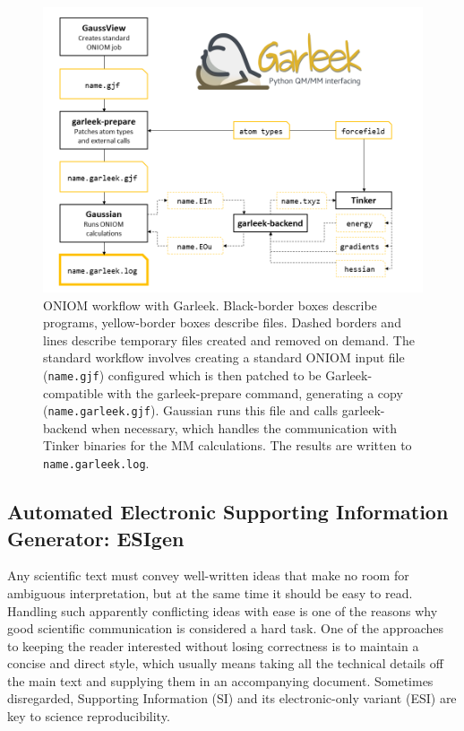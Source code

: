 \begin{figure}[H] %
	\includegraphics[width=\textwidth]{./figures/05/garleek.png}
	\cprotect\caption[ONIOM workflow with Garleek]{ONIOM workflow with Garleek. Black-border boxes describe programs, yellow-border boxes describe files. Dashed borders and lines describe temporary files created and removed on demand. The standard workflow involves creating a standard ONIOM input file (\texttt{name.gjf}) configured which is then patched to be Garleek-compatible with the garleek-prepare command, generating a copy (\texttt{name.garleek.gjf}). Gaussian runs this file and calls garleek-backend when necessary, which handles the communication with Tinker binaries for the MM calculations. The results are written to \texttt{name.garleek.log}.}
	\label{fig:garleek}
\end{figure}


\subsection{Automated Electronic Supporting Information Generator: ESIgen}


Any scientific text must convey well-written ideas that make no room for ambiguous interpretation, but at the same time it should be easy to read. Handling such apparently conflicting ideas with ease is one of the reasons why good scientific communication is considered a hard task. One of the approaches to keeping the reader interested without losing correctness is to maintain a concise and direct style, which usually means taking all the technical details off the main text and supplying them in an accompanying document. Sometimes disregarded, Supporting Information (SI) and its electronic-only variant (ESI) are key to science reproducibility.

